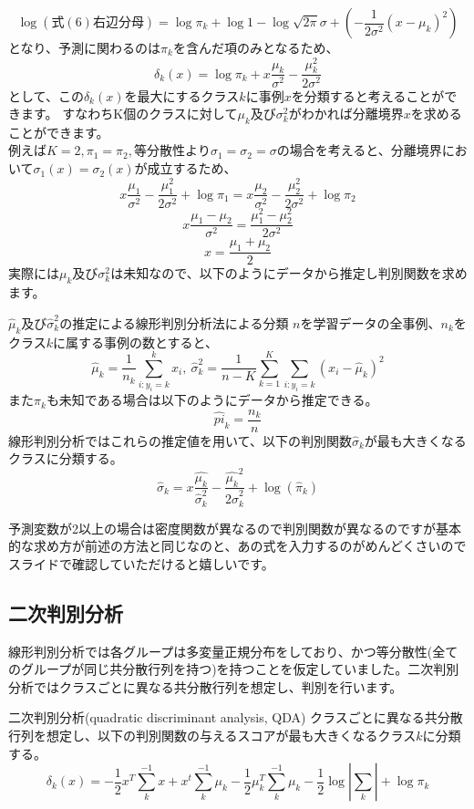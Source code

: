 \documentclass[uplatex]{jsarticle}
\begin{document}
$$\log(式(6)右辺分母) = \log{\pi_k} + \log{1} - \log{\sqrt{2\pi}\sigma} + \left(-\frac{1}{2\sigma^2}(x - \mu_k)^2 \right)$$
となり、予測に関わるのは$\pi_k$を含んだ項のみとなるため、
$$\delta_k(x) = \log{\pi_k} + x \frac{\mu_k}{\sigma^2} - \frac{\mu_k^2}{2\sigma^2}$$
として、この$\delta_k(x)$を最大にするクラス$k$に事例$x$を分類すると考えることができます。
すなわちK個のクラスに対して$\mu_k及び\sigma_k^2$がわかれば分離境界$x$を求めることができます。\\
例えば$K=2, \pi_1=\pi_2, 等分散性より\sigma_1 = \sigma_2 = \sigma$の場合を考えると、分離境界において$\sigma_1(x) = \sigma_2(x)$が成立するため、
$$x\frac{\mu_1}{\sigma^2} - \frac{\mu_1^2}{2\sigma^2} + \log{\pi_1} = x\frac{\mu_2}{\sigma^2} - \frac{\mu_2^2}{2\sigma^2} + \log{\pi_2}$$
$$x\frac{\mu_1 - \mu_2}{\sigma^2} = \frac{\mu_1^2 - \mu_2^2}{2\sigma^2}$$
$$x = \frac{\mu_1 + \mu_2}{2}$$
実際には$\mu_k及び\sigma_k^2$は未知なので、以下のようにデータから推定し判別関数を求めます。
\begin{itembox}[l]{$\hat{\mu}_k及び\hat{\sigma}_k^2$の推定による線形判別分析法による分類}
  $n$を学習データの全事例、$n_k$を クラス$k$に属する事例の数とすると、
  $$\hat{\mu}_k = \frac{1}{n_k}\sum_{i:y_i =k}^k x_i,\ \hat{\sigma}_k^2 = \frac{1}{n−K}\sum_{k=1}^K\sum_{i:y_i=k}(x_i - \hat{\mu}_k)^2$$
  また$\pi_k$も未知である場合は以下のようにデータから推定できる。
  $$\hat{pi}_k = \frac{n_k}{n}$$
  線形判別分析ではこれらの推定値を用いて、以下の判別関数$\hat{\sigma}_k$が最も大きくなるクラスに分類する。
  $$\hat{\sigma}_k = x\frac{\hat{\mu_k}}{\hat{\sigma}_k^2} - \frac{\hat{\mu_k}^2}{2\hat{\sigma}_k^2} + \log(\hat{\pi}_k)$$
\end{itembox}
予測変数が2以上の場合は密度関数が異なるので判別関数が異なるのですが基本的な求め方が前述の方法と同じなのと、あの式を入力するのがめんどくさいのでスライドで確認していただけると嬉しいです。

\subsection{二次判別分析}
線形判別分析では各グループは多変量正規分布をしており、かつ等分散性(全てのグループが同じ共分散行列を持つ)を持つことを仮定していました。二次判別分析ではクラスごとに異なる共分散行列を想定し、判別を行います。\
\begin{itembox}[l]{二次判別分析(quadratic discriminant analysis, QDA)}
  クラスごとに異なる共分散行列を想定し、以下の判別関数の与えるスコアが最も大きくなるクラス$k$に分類する。
  $$\delta_k(x) = -\frac{1}{2}x^T\sum_k^{-1}x + x^t\sum_k^{-1}\mu_k - \frac{1}{2}\mu_k^T\sum_k^{-1}\mu_k - \frac{1}{2}\log{|\sum_k|} + \log{\pi_k}$$
\end{itembox}
\end{document}
